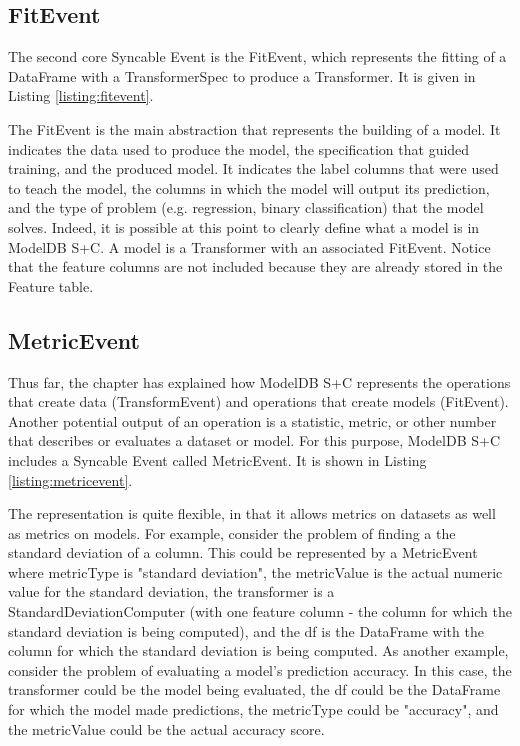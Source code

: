\subsection{FitEvent}

The second core Syncable Event is the FitEvent, which represents the fitting of a
DataFrame with a TransformerSpec to produce a Transformer. It is given in Listing \ref{listing:fitevent}.

The FitEvent is the main abstraction that represents the building of a model. It
indicates the data used to produce the model, the specification that guided training,
and the produced model. It indicates the label columns that were used to teach the
model, the columns in which the model will output its prediction, and the type of
problem (e.g. regression, binary classification) that the model solves. Indeed, it
is possible at this point to clearly define what a model is in ModelDB S+C. A model is
a Transformer with an associated FitEvent. 
Notice that the feature columns are not included because they are already stored in the Feature
table. 

\subsection{MetricEvent}
Thus far, the chapter has explained how ModelDB S+C represents the operations that create data (TransformEvent)
and operations that create models (FitEvent). Another potential output of an operation is a statistic, metric, or
other number that describes or evaluates a dataset or model. For this purpose, ModelDB S+C includes a Syncable Event
called MetricEvent. It is shown in Listing \ref{listing:metricevent}.

The representation is quite flexible, in that it allows metrics on datasets as well as
metrics on models. For example, consider the problem of finding a the standard deviation of a column.
This could be represented by a MetricEvent where metricType is "standard deviation", the metricValue
is the actual numeric value for the standard deviation, the transformer is a StandardDeviationComputer (with
one feature column - the column for which the standard deviation is being computed), and the df is the
DataFrame with the column for which the standard deviation is being computed. As another example, consider
the problem of evaluating a model's prediction accuracy. In this case, the transformer could be the model being
evaluated, the df could be the DataFrame for which the model made predictions, the metricType could be "accuracy",
and the metricValue could be the actual accuracy score.

